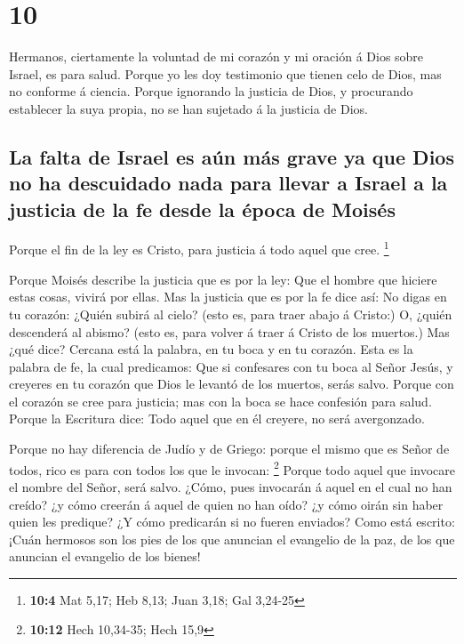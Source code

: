 \hypertarget{section-9}{%
\section{10}\label{section-9}}

 Hermanos, ciertamente la voluntad de mi corazón y mi
oración á Dios sobre Israel, es para salud.  Porque yo les
doy testimonio que tienen celo de Dios, mas no conforme á ciencia.
 Porque ignorando la justicia de Dios, y procurando
establecer la suya propia, no se han sujetado á la justicia de Dios.

\hypertarget{la-falta-de-israel-es-auxfan-muxe1s-grave-ya-que-dios-no-ha-descuidado-nada-para-llevar-a-israel-a-la-justicia-de-la-fe-desde-la-uxe9poca-de-moisuxe9s}{%
\subsection{La falta de Israel es aún más grave ya que Dios no ha
descuidado nada para llevar a Israel a la justicia de la fe desde la
época de
Moisés}\label{la-falta-de-israel-es-auxfan-muxe1s-grave-ya-que-dios-no-ha-descuidado-nada-para-llevar-a-israel-a-la-justicia-de-la-fe-desde-la-uxe9poca-de-moisuxe9s}}

 Porque el fin de la ley es Cristo, para justicia á todo
aquel que cree. \footnote{\textbf{10:4} Mat 5,17; Heb 8,13; Juan 3,18;
  Gal 3,24-25}

 Porque Moisés describe la justicia que es por la ley: Que
el hombre que hiciere estas cosas, vivirá por ellas.  Mas la
justicia que es por la fe dice así: No digas en tu corazón: ¿Quién
subirá al cielo? (esto es, para traer abajo á Cristo:)  O,
¿quién descenderá al abismo? (esto es, para volver á traer á Cristo de
los muertos.)  Mas ¿qué dice? Cercana está la palabra, en tu
boca y en tu corazón. Esta es la palabra de fe, la cual predicamos:
 Que si confesares con tu boca al Señor Jesús, y creyeres en
tu corazón que Dios le levantó de los muertos, serás salvo.
 Porque con el corazón se cree para justicia; mas con la
boca se hace confesión para salud.  Porque la Escritura
dice: Todo aquel que en él creyere, no será avergonzado.

 Porque no hay diferencia de Judío y de Griego: porque el
mismo que es Señor de todos, rico es para con todos los que le invocan:
\footnote{\textbf{10:12} Hech 10,34-35; Hech 15,9}  Porque
todo aquel que invocare el nombre del Señor, será salvo. 
¿Cómo, pues invocarán á aquel en el cual no han creído? ¿y cómo creerán
á aquel de quien no han oído? ¿y cómo oirán sin haber quien les
predique?  ¿Y cómo predicarán si no fueren enviados? Como
está escrito: ¡Cuán hermosos son los pies de los que anuncian el
evangelio de la paz, de los que anuncian el evangelio de los bienes!


